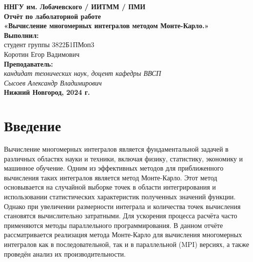 \documentclass[a4paper,12pt]{article}
\begin{document}
\begin{titlepage}
    \begin{center}
        \large 
        \textbf{ННГУ им. Лобачевского / ИИТММ / ПМИ}\\[0.5cm]

        \vspace{4cm}
        \textbf{\Large Отчёт по лаболаторной работе}\\
        \textbf{\large «Вычисление многомерных интегралов методом Монте-Карло.»}\\[3cm]

        \vspace{3cm}
        \textbf{Выполнил:}\\
        студент группы 3822Б1ПМоп3 \\
        Коротин Егор Вадимович\\

        \textbf{Преподаватель:}\\
        \textit{кандидат технических наук, доцент кафедры ВВСП}\\
        \textit{Сысоев Александр Владимирович}\\[2cm]

        \vspace{1.5cm}
        \textbf{Нижний Новгород, 2024 г.}
    \end{center}
\end{titlepage}

\tableofcontents
\newpage

\section{Введение}

Вычисление многомерных интегралов является фундаментальной задачей в различных областях науки и техники, включая физику, статистику, экономику и машинное обучение. Одним из эффективных методов для приближенного вычисления таких интегралов является метод Монте-Карло. Этот метод основывается на случайной выборке точек в области интегрирования и использовании статистических характеристик полученных значений функции. Однако при увеличении размерности интеграла и количества точек вычисления становятся вычислительно затратными. Для ускорения процесса расчёта часто применяются методы параллельного программирования. В данном отчёте рассматривается реализация метода Монте-Карло для вычисления многомерных интегралов как в последовательной, так и в параллельной (MPI) версиях, а также проведён анализ их производительности.
\end{document}
